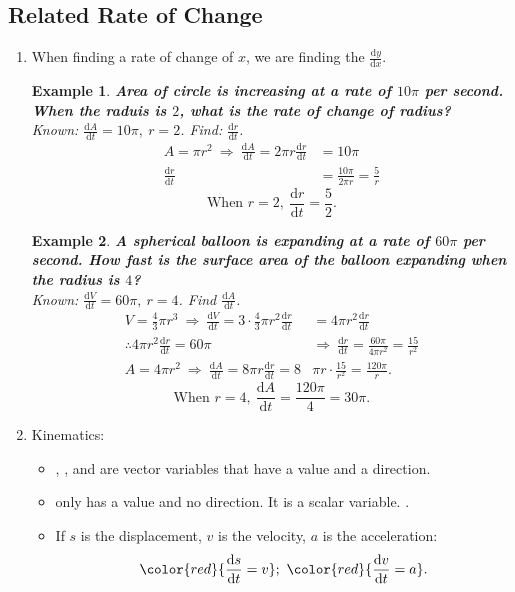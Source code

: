 \documentclass[12pt, a4paper]{article}
\newtheorem{example}{Example}[subsection]
\begin{document}
\subsection{Related Rate of Change}
\begin{enumerate}
    \item When finding a rate of change of $x$, we are finding the $\frac{\mathrm{d}y}{\mathrm{d}x}$.
    \begin{example}
        \textbf{Area of circle is increasing at a rate of $10\pi$ per second. When the raduis is $2$, what is the rate of change of radius? }\\
        Known: $\frac{\mathrm{d}A}{\mathrm{d}t}=10\pi,\ r=2$. Find: $\frac{\mathrm{d}r}{\mathrm{d}t}$.
        $$\begin{aligned}
            A=\pi r^2 \ \Rightarrow \ \frac{\mathrm{d}A}{\mathrm{d}t}=2\pi r\frac{\mathrm{d}r}{\mathrm{d}t}&=10\pi\\
            \frac{\mathrm{d}r}{\mathrm{d}t}&=\frac{10\pi}{2\pi r}=\frac{5}{r}
        \end{aligned}$$
        $$\text{When }r=2,\ \frac{\mathrm{d}r}{\mathrm{d}t}=\frac{5}{2}.$$
    \end{example}
    \begin{example}
        \textbf{A spherical balloon is expanding at a rate of $60\pi$ per second. How fast is the surface area of the balloon expanding when the radius is $4$? }\\
        Known: $\frac{\mathrm{d}V}{\mathrm{d}t}=60\pi,\ r=4$. Find $\frac{\mathrm{d}A}{\mathrm{d}t}$.
        $$\begin{aligned}
            V=\frac{4}{3}\pi r^3\ \Rightarrow\ \frac{\mathrm{d}V}{\mathrm{d}t}=3\cdot\frac{4}{3}\pi r^2\frac{\mathrm{d}r}{\mathrm{d}t}&=4\pi r^2\frac{\mathrm{d}r}{\mathrm{d}t}\\
            \therefore 4\pi r^2\frac{\mathrm{d}r}{\mathrm{d}t}=60\pi\ &\Rightarrow\ \frac{\mathrm{d}r}{\mathrm{d}t}=\frac{60\pi}{4\pi r^2}=\frac{15}{r^2}\\
            A=4\pi r^2\ \Rightarrow\ \frac{\mathrm{d}A}{\mathrm{d}t}=8\pi r\frac{\mathrm{d}r}{\mathrm{d}t}=8&\pi r\cdot\frac{15}{r^2}=\frac{120\pi}{r}.
        \end{aligned}$$
        $$\text{When }r=4,\ \frac{\mathrm{d}A}{\mathrm{d}t}=\frac{120\pi}{4}=30\pi.$$
    \end{example}
    \item Kinematics: 
    \begin{itemize}
        \item {\color{red}{Velocity}}, {\color{red}{displacement}}, and {\color{red}{acceleration}} are vector variables that have a value and a direction. 
        \item {\color{red}{Speed}} only has a value and no direction. It is a scalar variable. {\color{green}{No sign should be reported in the answer}}.
        \item If $s$ is the displacement, $v$ is the velocity, $a$ is the acceleration: $${\color{red}{\frac{\mathrm{d}s}{\mathrm{d}t}=v}};\ {\color{red}{\frac{\mathrm{d}v}{\mathrm{d}t}=a}}.$$
    \end{itemize}
\end{enumerate}
\end{document}
